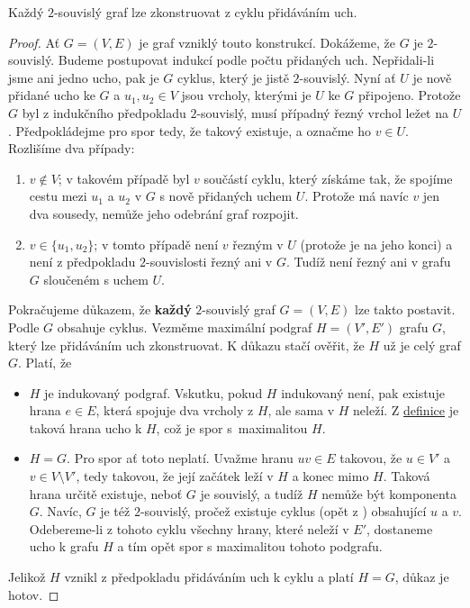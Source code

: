 \begin{lemma}
 \label{lem:konstrukce-pres-ucha}
 Každý $2$-souvislý graf lze zkonstruovat z cyklu přidáváním uch.
\end{lemma}
\begin{proof}
 Ať $G = (V,E)$ je graf vzniklý touto konstrukcí. Dokážeme, že $G$ je
 $2$-souvislý. Budeme postupovat indukcí podle počtu přidaných uch. Nepřidali-li
 jsme ani jedno ucho, pak je $G$ cyklus, který je jistě $2$-souvislý. Nyní ať
 $U$ je nově přidané ucho ke $G$ a $u_1,u_2 \in V$ jsou vrcholy, kterými je $U$
 ke $G$ připojeno. Protože $G$ byl z indukčního předpokladu $2$-souvislý, musí
 případný řezný vrchol ležet na $U$. Předpokládejme pro spor tedy, že takový
 existuje, a označme ho $v \in U$. Rozlišíme dva případy:
 \begin{enumerate}
  \item $v \notin V$; v takovém případě byl $v$ součástí cyklu, který získáme
   tak, že spojíme cestu mezi $u_1$ a $u_2$ v $G$ s nově přidaných uchem $U$.
   Protože má navíc $v$ jen dva sousedy, nemůže jeho odebrání graf rozpojit.
  \item $v \in \{u_1,u_2\}$; v tomto případě není $v$ řezným v $U$ (protože je
   na jeho konci) a není z předpokladu $2$-souvislosti řezný ani v $G$. Tudíž
   není řezný ani v grafu $G$ sloučeném s uchem $U$.
 \end{enumerate}

 Pokračujeme důkazem, že \textbf{každý} $2$-souvislý graf $G = (V,E)$ lze takto
 postavit. Podle  $G$ obsahuje cyklus.
 Vezměme maximální podgraf $H = (V',E')$ grafu $G$, který lze přidáváním uch
 zkonstruovat. K důkazu stačí ověřit, že $H$ už je celý graf $G$. Platí, že
 \begin{itemize}
  \item $H$ je indukovaný podgraf. Vskutku, pokud $H$ indukovaný není, pak
   existuje hrana $e \in E$, která spojuje dva vrcholy z $H$, ale sama v $H$
   neleží. Z \hyperref[def:ucho]{definice} je taková hrana ucho k $H$, což je
   spor s~maximalitou $H$.
  \item $H = G$. Pro spor ať toto neplatí. Uvažme hranu $uv \in E$ takovou, že
   $u \in V'$ a $v \in V \setminus V'$, tedy takovou, že její začátek leží v $H$
   a konec mimo $H$. Taková hrana určitě existuje, neboť $G$ je souvislý, a
   tudíž $H$ nemůže být komponenta $G$. Navíc, $G$ je též $2$-souvislý, pročež
   existuje cyklus (opět z ) obsahující
   $u$ a $v$. Odebereme-li z tohoto cyklu všechny hrany, které neleží v $E'$,
   dostaneme ucho k grafu $H$ a tím opět spor s maximalitou tohoto podgrafu.
 \end{itemize}
 Jelikož $H$ vznikl z předpokladu přidáváním uch k cyklu a platí $H = G$, důkaz
 je hotov.
\end{proof}

